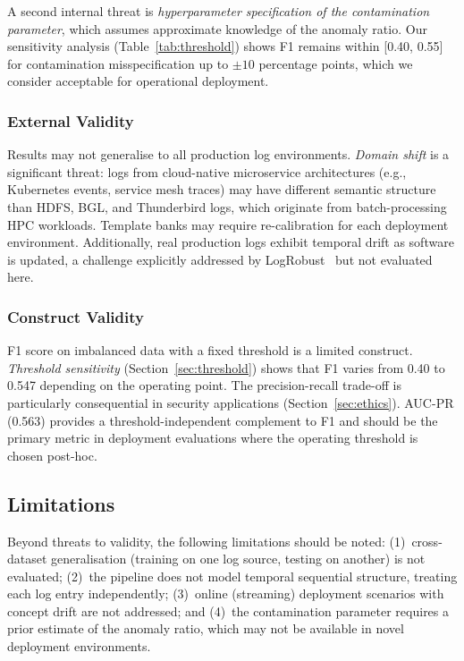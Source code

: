\documentclass[conference]{IEEEtran}
\begin{document}
A second internal threat is \emph{hyperparameter specification of the
contamination parameter}, which assumes approximate knowledge of the anomaly
ratio.  Our sensitivity analysis (Table~\ref{tab:threshold}) shows F1 remains
within [0.40, 0.55] for contamination misspecification up to $\pm 10$
percentage points, which we consider acceptable for operational deployment.

\subsubsection{External Validity}
Results may not generalise to all production log environments.
\emph{Domain shift} is a significant threat: logs from cloud-native
microservice architectures (e.g., Kubernetes events, service mesh traces)
may have different semantic structure than HDFS, BGL, and Thunderbird logs,
which originate from batch-processing HPC workloads.  Template banks may
require re-calibration for each deployment environment.  Additionally,
real production logs exhibit temporal drift as software is updated, a
challenge explicitly addressed by LogRobust~\cite{zhang2019} but not
evaluated here.

\subsubsection{Construct Validity}
F1 score on imbalanced data with a fixed threshold is a limited construct.
\emph{Threshold sensitivity} (Section~\ref{sec:threshold}) shows that F1
varies from 0.40 to 0.547 depending on the operating point.  The
precision-recall trade-off is particularly consequential in security
applications (Section~\ref{sec:ethics}).  AUC-PR (0.563) provides a
threshold-independent complement to F1 and should be the primary metric in
deployment evaluations where the operating threshold is chosen post-hoc.

\subsection{Limitations}

Beyond threats to validity, the following limitations should be noted:
(1)~cross-dataset generalisation (training on one log source, testing on
another) is not evaluated; (2)~the pipeline does not model temporal
sequential structure, treating each log entry independently; (3)~online
(streaming) deployment scenarios with concept drift are not addressed;
and (4)~the contamination parameter requires a prior estimate of the
anomaly ratio, which may not be available in novel deployment environments.
\end{document}
